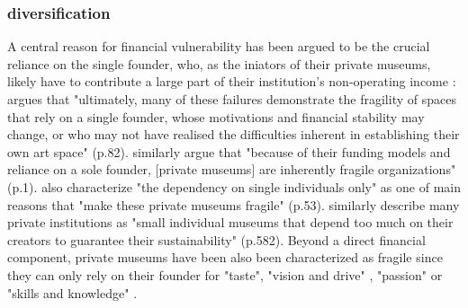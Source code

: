 \documentclass[12pt]{article}
\begin{document}
\subsubsection*{diversification}




A central reason for financial vulnerability has been argued to be the crucial reliance on the single founder, who, as the iniators of their private museums, likely have to contribute a large part of their institution's non-operating income \parencite{Frey_Meier_2002_beyeler}:
\textcite{Adam_2021_rise} argues that "ultimately, many of these failures demonstrate the fragility of spaces that rely on a single founder, whose motivations and financial stability may change, or who may not have realised the difficulties inherent in establishing their own art space" (p.82).
\textcite{Velthuis_Gera_2024_fragility} similarly argue that "because of their funding models and reliance on a sole founder, [private museums] are inherently fragile organizations" (p.1).
\textcite{Bechtler_Imhof_2018_future} also characterize "the dependency on single individuals only" as one of main reasons that "make these private museums fragile" (p.53).
\textcite{StylianouLambert_etal_2014_museums} similarly describe many private institutions as "small individual museums that depend too much on their creators to guarantee their sustainability" (p.582).
Beyond a direct financial component, private museums have been also been characterized as fragile since they can only rely on their founder for "taste", "vision and drive" \parencite[p.77]{Adam_2021_rise}, "passion" \parencite[p.234]{Walker_2019_collector} or "skills and knowledge" \parencite[p.580]{StylianouLambert_etal_2014_museums}.
\end{document}
